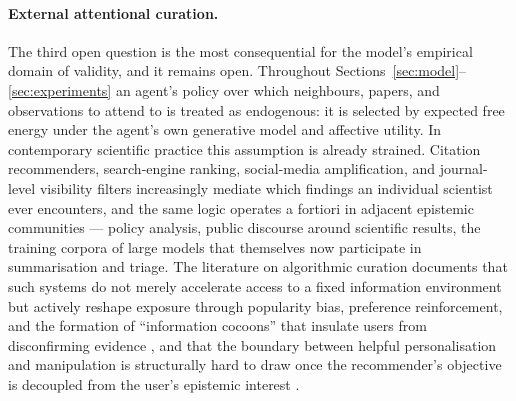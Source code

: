 %
%
%

\paragraph{External attentional curation.}
The third open question is the most consequential for the model's empirical
domain of validity, and it remains open. Throughout
Sections~\ref{sec:model}--\ref{sec:experiments} an agent's policy over which
neighbours, papers, and observations to attend to is treated as endogenous: it
is selected by expected free energy under the agent's own generative model and
affective utility. In contemporary scientific practice this assumption is
already strained. Citation recommenders, search-engine ranking, social-media
amplification, and journal-level visibility filters increasingly mediate which
findings an individual scientist ever encounters, and the same logic operates a
fortiori in adjacent epistemic communities --- policy analysis, public
discourse around scientific results, the training corpora of large models that
themselves now participate in summarisation and triage. The literature on
algorithmic curation documents that such systems do not merely accelerate
access to a fixed information environment but actively reshape exposure
through popularity bias, preference reinforcement, and the formation of
``information cocoons'' that insulate users from disconfirming evidence
\citep{Lin2026_1, Zhao2020_3}, and that the boundary between helpful
personalisation and manipulation is structurally hard to draw once the
recommender's objective is decoupled from the user's epistemic interest
\citep{D2025_2}.

